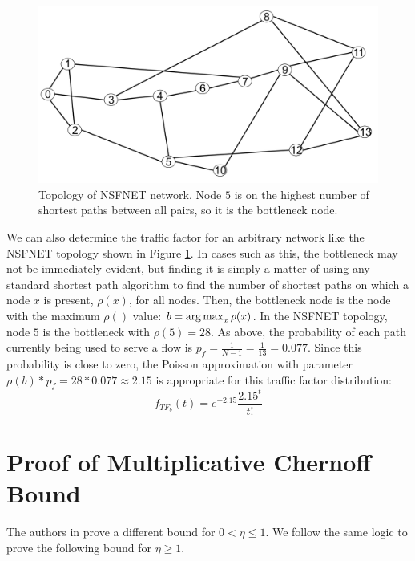 \begin{figure}
\begin{centering}
    \includegraphics[scale=0.25]{figures/NSF_net.png}
    \caption{Topology of NSFNET network. Node $5$ is on the highest number of shortest paths between all pairs, so it is the bottleneck node.}
    \label{fig:NSF_net}
\end{centering}
\end{figure}

We can also determine the traffic factor for an arbitrary network like the NSFNET topology \cite{nsf_net} shown in Figure \ref{fig:NSF_net}. In cases such as this, the bottleneck may not be immediately evident, but finding it is simply a matter of using any standard shortest path algorithm to find the number of shortest paths on which a node $x$ is present, $\rho(x)$, for all nodes. Then, the bottleneck node is the node with the maximum $\rho()$ value: $b = \operatorname*{arg\,max}_{x} \rho(x)$. In the NSFNET topology, node $5$ is the bottleneck with $\rho(5) = 28$. As above, the probability of each path currently being used to serve a flow is $p_f = \frac{1}{N-1} = \frac{1}{13} = 0.077$. Since this probability is close to zero, the Poisson approximation with parameter $\rho(b)*p_f = 28*0.077 \approx 2.15$ is appropriate for this traffic factor distribution:
\begin{equation*}
  f_{TF_b}(t) = e^{-2.15} \frac{2.15^t}{t!}
\end{equation*}

\section{Proof of Multiplicative Chernoff Bound}
\label{sec:chernoff_bound_proof}

The authors in \cite{mitzenmacher2005probability} prove a different bound for $0 < \eta \leq 1$.  We follow the same logic to prove the following bound for $\eta \geq 1$.

